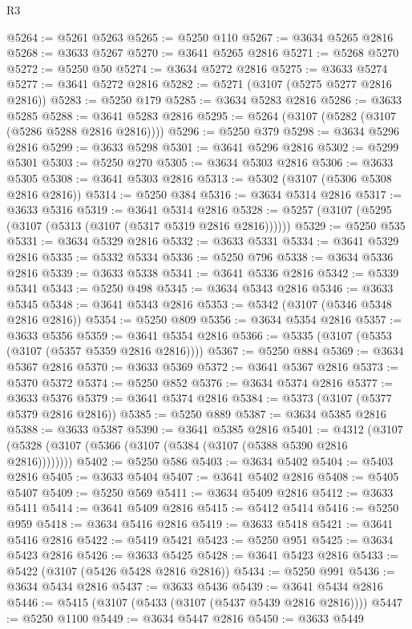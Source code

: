 \begin{lexlean}{R3}
\begin{coremodule}
@5264 := @5261 @5263
@5265 := @5250 @110
@5267 := @3634 @5265 @2816
@5268 := @3633 @5267
@5270 := @3641 @5265 @2816
@5271 := @5268 @5270
@5272 := @5250 @50
@5274 := @3634 @5272 @2816
@5275 := @3633 @5274
@5277 := @3641 @5272 @2816
@5282 := @5271 (@3107 (@5275 @5277 @2816 @2816))
@5283 := @5250 @179
@5285 := @3634 @5283 @2816
@5286 := @3633 @5285
@5288 := @3641 @5283 @2816
@5295 := @5264 (@3107 (@5282 (@3107 (@5286 @5288 @2816 @2816))))
@5296 := @5250 @379
@5298 := @3634 @5296 @2816
@5299 := @3633 @5298
@5301 := @3641 @5296 @2816
@5302 := @5299 @5301
@5303 := @5250 @270
@5305 := @3634 @5303 @2816
@5306 := @3633 @5305
@5308 := @3641 @5303 @2816
@5313 := @5302 (@3107 (@5306 @5308 @2816 @2816))
@5314 := @5250 @384
@5316 := @3634 @5314 @2816
@5317 := @3633 @5316
@5319 := @3641 @5314 @2816
@5328 := @5257 (@3107 (@5295 (@3107 (@5313 (@3107 (@5317 @5319 @2816 @2816))))))
@5329 := @5250 @535
@5331 := @3634 @5329 @2816
@5332 := @3633 @5331
@5334 := @3641 @5329 @2816
@5335 := @5332 @5334
@5336 := @5250 @796
@5338 := @3634 @5336 @2816
@5339 := @3633 @5338
@5341 := @3641 @5336 @2816
@5342 := @5339 @5341
@5343 := @5250 @498
@5345 := @3634 @5343 @2816
@5346 := @3633 @5345
@5348 := @3641 @5343 @2816
@5353 := @5342 (@3107 (@5346 @5348 @2816 @2816))
@5354 := @5250 @809
@5356 := @3634 @5354 @2816
@5357 := @3633 @5356
@5359 := @3641 @5354 @2816
@5366 := @5335 (@3107 (@5353 (@3107 (@5357 @5359 @2816 @2816))))
@5367 := @5250 @884
@5369 := @3634 @5367 @2816
@5370 := @3633 @5369
@5372 := @3641 @5367 @2816
@5373 := @5370 @5372
@5374 := @5250 @852
@5376 := @3634 @5374 @2816
@5377 := @3633 @5376
@5379 := @3641 @5374 @2816
@5384 := @5373 (@3107 (@5377 @5379 @2816 @2816))
@5385 := @5250 @889
@5387 := @3634 @5385 @2816
@5388 := @3633 @5387
@5390 := @3641 @5385 @2816
@5401 := @4312 (@3107 (@5328 (@3107 (@5366 (@3107 (@5384 (@3107 (@5388 @5390 @2816 @2816))))))))
@5402 := @5250 @586
@5403 := @3634 @5402
@5404 := @5403 @2816
@5405 := @3633 @5404
@5407 := @3641 @5402 @2816
@5408 := @5405 @5407
@5409 := @5250 @569
@5411 := @3634 @5409 @2816
@5412 := @3633 @5411
@5414 := @3641 @5409 @2816
@5415 := @5412 @5414
@5416 := @5250 @959
@5418 := @3634 @5416 @2816
@5419 := @3633 @5418
@5421 := @3641 @5416 @2816
@5422 := @5419 @5421
@5423 := @5250 @951
@5425 := @3634 @5423 @2816
@5426 := @3633 @5425
@5428 := @3641 @5423 @2816
@5433 := @5422 (@3107 (@5426 @5428 @2816 @2816))
@5434 := @5250 @991
@5436 := @3634 @5434 @2816
@5437 := @3633 @5436
@5439 := @3641 @5434 @2816
@5446 := @5415 (@3107 (@5433 (@3107 (@5437 @5439 @2816 @2816))))
@5447 := @5250 @1100
@5449 := @3634 @5447 @2816
@5450 := @3633 @5449

\end{coremodule}
\end{lexlean}
